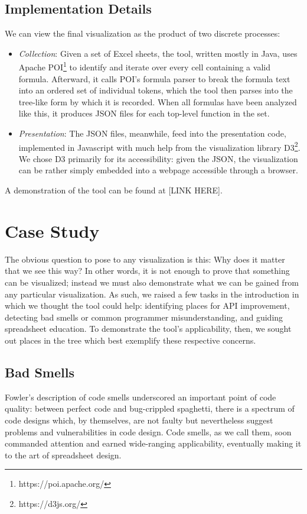 \documentclass[conference]{IEEEtran}
\begin{document}
	\subsection{Implementation Details} We can view the final visualization as the
	product of two discrete processes: \begin{itemize} \item \textit{Collection}:
		Given a set of Excel sheets, the tool, written mostly in Java, uses Apache
		POI\footnote{https://poi.apache.org/} to identify and iterate over every cell
		containing a valid formula. Afterward, it calls POI's formula parser to break
		the formula text into an ordered set of individual tokens, which the tool then
		parses into the tree-like form by which it is recorded. When all formulas have
		been analyzed like this, it produces JSON files for each top-level function in
		the set. \item \textit{Presentation}: The JSON files, meanwhile, feed into the
		presentation code, implemented in Javascript with much help from the
		visualization library D3\footnote{https://d3js.org/}. We chose D3 primarily for
		its accessibility: given the JSON, the visualization can be rather simply
		embedded into a webpage accessible through a browser. \end{itemize} A
	demonstration of the tool can be found at [LINK HERE].
	
	\section{Case Study} The obvious question to pose to any visualization is this:
	Why does it matter that we see this way? In other words, it is not enough to
	prove that something can be visualized; instead we must also demonstrate what
	we can be gained from any particular visualization. As such, we raised a few
	tasks in the introduction in which we thought the tool could help: identifying
	places for API improvement, detecting bad smells or common programmer
	misunderstanding, and guiding spreadsheet education. To demonstrate the tool's
	applicability, then, we sought out places in the tree which best exemplify
	these respective concerns.
	
	\subsection{Bad Smells} Fowler's description of code smells \cite{fowler2009refactoring}
	underscored an important point of code quality: between perfect code and
	bug-crippled spaghetti,  there is a spectrum of code designs which, by
	themselves, are not faulty but nevertheless suggest problems and
	vulnerabilities in code design. Code smells, as we call them, soon commanded
	attention and earned wide-ranging applicability, eventually making it to the
	art of spreadsheet design. 
	
\end{document}
